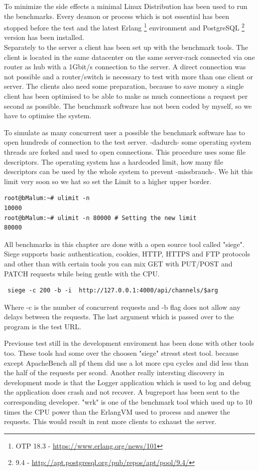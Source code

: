 \textcolor{newcode}{To minimize the side effects a minimal Linux Distribution has been used to run the benchmarks. Every deamon or process which is not essential has been stopped before the test and the latest Erlang \footnote{OTP 18.3 - \url{https://www.erlang.org/news/101}} environment and PostgreSQL \footnote{9.4 - \url{http://apt.postgresql.org/pub/repos/apt/pool/9.4/}} version has been installed.}
\ \\ \newline
\textcolor{newcode}{Separately to the server a client has been set up with the benchmark tools. The client is located in the same datacenter on the same server-rack connected via one router as hub with a 1Gbit/s connection to the server. A direct connection was not possible and a router/switch is necessary to test with more than one client or server. The clients also need some preparation, because to save money a single client has been optimised to be able to make as much connections a request per second as possible. The benchmark software has not been coded by myself, so we have to optimise the system.}

\textcolor{newcode}{To simulate as many concurrent user a possible the benchmark software has to open hundreds of connection to the test server. -dadurch- some operating system threads are forked and used to open connections. This procedure uses some file descriptors. The operating system has a hardcoded limit, how many file descriptors can be used by the whole system to prevent -missbrauch-. We hit this limit very soon so we hat so set the Limit to a higher upper border.}
\begin{verbatim}
root@bMalum:~# ulimit -n
10000
root@bMalum:~# ulimit -n 80000 # Setting the new limit
80000
\end{verbatim}

All benchmarks in this chapter are done with a open source tool called "siege". Siege supports basic authentication, cookies, HTTP, HTTPS and FTP protocols and other than with certain tools you can mix GET with PUT/POST and PATCH requests while being gentle with the CPU.
\begin{verbatim} siege -c 200 -b -i  http://127.0.0.1:4000/api/channels/$arg
\end{verbatim} Where -c is the number of concurrent requests and -b flag does not allow any delays between the requests. The last argument which is passed over to the program is the test URL.

\textcolor{newcode}{
Previouse test still in the development enviroment has been done with other tools too. These tools had some over the choosen "siege" stresst stest tool. because except ApacheBench all pf them did use a lot more cpu cycles and did less than the half of the requests per scond. Another really intersting discovery in development mode is that the Logger application which is used to log and debug the application does crash and not recover. A bugreport has been sent to the corresponding developer.
"wrk" is one of the benchmark tool which used up to 10 times the CPU power than the ErlangVM used to process and answer the requests. This would result in rent more clients to exhaust the server.  
}


